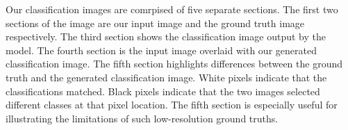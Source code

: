\documentclass[12pt]{article}
\begin{document}
Our classification images are comrpised of five separate sections. The first two sections of the image are our input image and the ground truth image respectively. The third section shows the classification image output by the model. The fourth section is the input image overlaid with our generated classification image. The fifth section highlights differences between the ground truth and the generated classification image. White pixels indicate that the classifications matched. Black pixels indicate that the two images selected different classes at that pixel location. The fifth section is especially useful for illustrating the limitations of such low-resolution ground truths.  

 
\newpage


\end{document}
